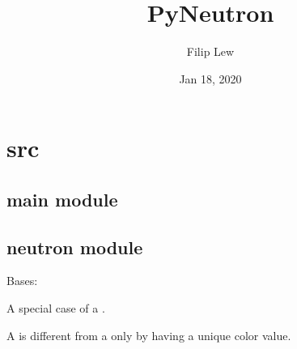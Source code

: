 \documentclass[letterpaper,10pt,english,openany,oneside]{sphinxmanual}
\title{PyNeutron}
\date{Jan 18, 2020}
\author{Filip Lew}
\begin{document}
\pagestyle{empty}
\sphinxmaketitle
\pagestyle{plain}
\sphinxtableofcontents
\pagestyle{normal}
\label{\detokenize{index::doc}}



\chapter{src}
\label{\detokenize{modules:src}}\label{\detokenize{modules::doc}}

\section{main module}
\label{\detokenize{main:module-main}}\label{\detokenize{main:main-module}}\label{\detokenize{main::doc}}

\section{neutron module}
\label{\detokenize{neutron:module-neutron}}\label{\detokenize{neutron:neutron-module}}\label{\detokenize{neutron::doc}}

\begin{fulllineitems}
\label{\detokenize{neutron:neutron.Neutron}}
Bases: {\hyperref[\detokenize{neutron:neutron.Soldier}]{}}

A special case of a {\hyperref[\detokenize{neutron:neutron.Soldier}]{}}.

A {\hyperref[\detokenize{neutron:neutron.Neutron}]{}} is different from a {\hyperref[\detokenize{neutron:neutron.Soldier}]{}} only by having a
unique color value.

\begin{fulllineitems}
\label{\detokenize{neutron:neutron.Neutron.VALUE}}
\end{fulllineitems}


\end{fulllineitems}
\end{document}

